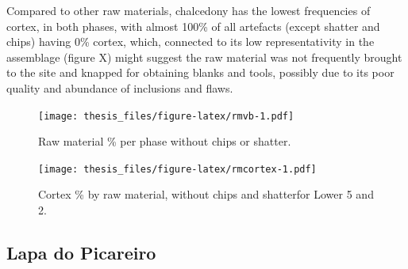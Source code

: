 \documentclass[12pt,twoside]{reedthesis}
\begin{document}
Compared to other raw materials, chalcedony has the lowest frequencies of cortex, in both phases, with almost 100\% of all artefacts (except shatter and chips) having 0\% cortex, which, connected to its low representativity in the assemblage (figure X) might suggest the raw material was not frequently brought to the site and knapped for obtaining blanks and tools, possibly due to its poor quality and abundance of inclusions and flaws.
\begin{figure}
\centering
\texttt{[image: thesis\_files/figure-latex/rmvb-1.pdf]}
\caption{\label{fig:rmvb}Raw material \% per phase without chips or shatter.}
\end{figure}
\begin{figure}
\centering
\texttt{[image: thesis\_files/figure-latex/rmcortex-1.pdf]}
\caption{\label{fig:rmcortex}Cortex \% by raw material, without chips and shatterfor Lower 5 and 2.}
\end{figure}
\begin{table}

\caption{\label{tab:cortextab1}Cortex type and localization by raw material (Lower 5).}
\centering
{}
\end{table}
\begin{table}

\caption{\label{tab:cortextab2}Cortex type and localization by raw material (Upper 5/4E).}
\centering
{}
\end{table}
\hypertarget{lapa-do-picareiro-3}{%
\subsection{Lapa do Picareiro}\label{lapa-do-picareiro-3}}
\end{document}

